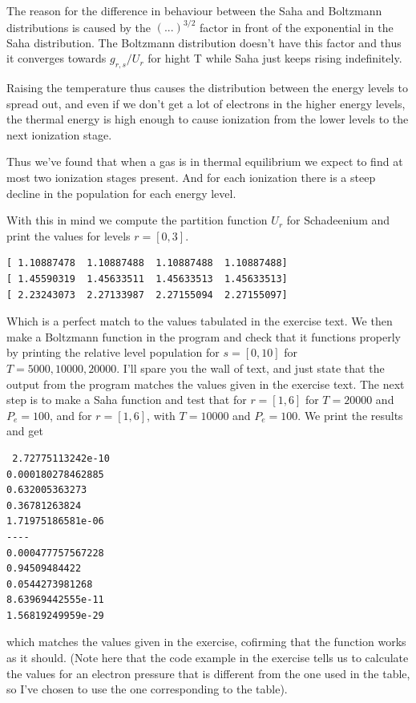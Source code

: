 \documentclass{aa}   %
\begin{document}
The reason for the difference in behaviour between the Saha and Boltzmann distributions is caused by the $(...)^{3/2}$ factor in front of the exponential in the Saha distribution. The Boltzmann distribution doesn't have this factor and thus it converges towards $g_{r,s}/U_r$ for hight T while Saha just keeps rising indefinitely.

Raising the temperature thus causes the distribution between the energy levels to spread out, and even if we don't get a lot of electrons in the higher energy levels, the thermal energy is high enough to cause ionization from the lower levels to the next ionization stage.

Thus we've found that when a gas is in thermal equilibrium we expect to find at most two ionization stages present. And for each ionization there is a steep decline in the population for each energy level.

With this in mind we compute the partition function $U_r$ for Schadeenium and print the values for levels $r =[0,3]$.
\begin{verbatim}
[ 1.10887478  1.10887488  1.10887488  1.10887488]
[ 1.45590319  1.45633511  1.45633513  1.45633513]
[ 2.23243073  2.27133987  2.27155094  2.27155097]
\end{verbatim}
Which is a perfect match to the values tabulated in the exercise text.
We then make a Boltzmann function in the program and check that it functions properly by printing the relative level population for $s = [0,10]$ for $T = 5000,10000,20000$. I'll spare you the wall of text, and just state that the output from the program matches the values given in the exercise text.
The next step is to make a Saha function and test that for $r = [1,6]$ for $T = 20000$ and $P_e = 100$, and for $r = [1,6]$, with $T = 10000$ and $P_e = 100$. We print the results and get 
\begin{verbatim}
 2.72775113242e-10
0.000180278462885
0.632005363273
0.36781263824
1.71975186581e-06
----
0.000477757567228
0.94509484422
0.0544273981268
8.63969442555e-11
1.56819249959e-29
\end{verbatim}
which matches the values given in the exercise, cofirming that the function works as it should.
(Note here that the code example in the exercise tells us to calculate the values for an electron pressure that is different from the one used in the table, so I've chosen to use the one corresponding to the table).
\end{document}
